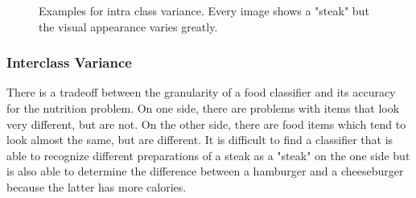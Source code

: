 \begin{figure}[htb]
\centering
\hspace{\fill}%
\hspace{\fill}%
\hspace{\fill}%
\hspace{\fill}%

\caption{Examples for intra class variance. Every image shows a "steak" but the visual appearance varies greatly.}
\label{fig:intraClassVariance}
\end{figure}

\subsubsection*{Interclass Variance}
There is a tradeoff between the granularity of a food classifier and its accuracy for the nutrition problem. On one side, there are problems with items that look very different, but are not. On the other side, there are food items which tend to look almost the same, but are different. It is difficult to find a classifier that is able to recognize different preparations of a steak as a "steak" on the one side but is also able to determine the difference between a hamburger and a cheeseburger because the latter has more calories.

